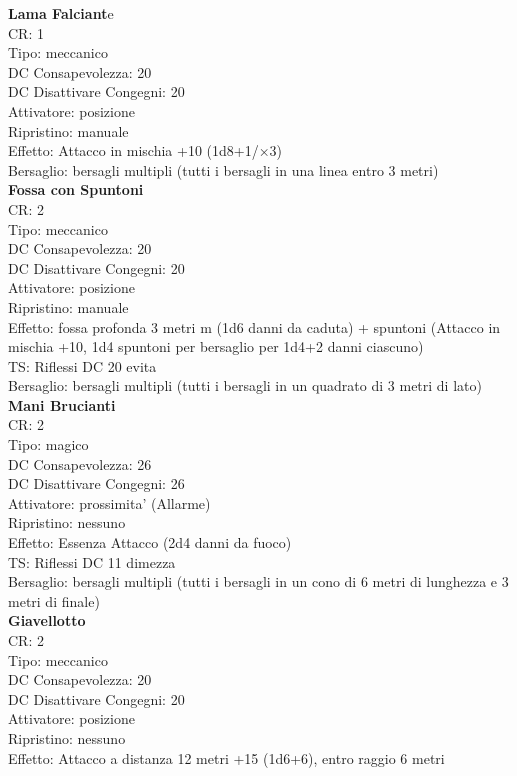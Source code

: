 \documentclass[a4paper,11pt,twoside,openany]{book}
\begin{document}
{\begin{multicols}{2}
\textbf{Lama Falciant}e\\
CR: 1 \\
Tipo: meccanico \\
DC Consapevolezza: 20 \\
DC Disattivare Congegni: 20 \\
Attivatore: posizione \\
Ripristino: manuale \\
Effetto: Attacco in mischia +10 (1d8+1/×3) \\
Bersaglio: bersagli multipli (tutti i bersagli in una linea entro 3 metri)\\

\textbf{Fossa con Spuntoni}\\
CR: 2 \\
Tipo: meccanico \\
DC Consapevolezza: 20 \\
DC Disattivare Congegni: 20 \\
Attivatore: posizione \\
Ripristino: manuale \\
Effetto: fossa profonda 3 metri m (1d6 danni da caduta) + spuntoni (Attacco in mischia +10, 1d4 spuntoni per bersaglio per 1d4+2 danni ciascuno) \\
TS: Riflessi DC 20 evita \\
Bersaglio: bersagli multipli (tutti i bersagli in un quadrato di 3 metri di lato)\\

\textbf{Mani Brucianti}\\
CR: 2 \\
Tipo: magico \\
DC Consapevolezza: 26 \\
DC Disattivare Congegni: 26 \\
Attivatore: prossimita' (Allarme) \\
Ripristino: nessuno \\
Effetto: Essenza Attacco (2d4 danni da fuoco) \\
TS: Riflessi DC 11 dimezza \\
Bersaglio: bersagli multipli (tutti i bersagli in un cono di 6 metri di lunghezza e 3 metri di finale)\\

\textbf{Giavellotto}\\
CR: 2 \\
Tipo: meccanico \\
DC Consapevolezza: 20 \\
DC Disattivare Congegni: 20 \\
Attivatore: posizione \\
Ripristino: nessuno \\
Effetto: Attacco a distanza 12 metri +15 (1d6+6), entro raggio 6 metri\\


\end{multicols}}
\end{document}
